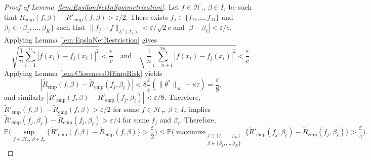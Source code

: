 \documentclass[twoside, onecolumn]{article}
\def\Hcal{\mathcal{H}}
\def\Hcal{\mathcal{H}}
\DeclareMathOperator*{\maximize}{maximize}
\begin{document}
\begin{proof}[Proof of Lemma~\ref{lem:EpsilonNetInSymmetrization}]


Let $f\in \mathcal{H}_\tau$, $\beta\in I_\tau$ be such that $\widetilde R_{\text{emp}}(f,\beta)-\widetilde R'_{\text{emp}}(f,\beta)>\varepsilon/2$. There exists $f_j\in \{f_1, \dots, f_M\}$ and $\beta_\ell\in \{\beta_1, \dots, \beta_K\}$ such that $\|f_j-f\|_{L^2(T_x)}<\varepsilon/\sqrt{2}c$ and $|\beta-\beta_\ell|<\varepsilon/c$. Applying Lemma \ref{lem:EpslnNetRestriction} gives
\[
\sqrt{\frac{1}{n}\sum_{i=1}^{n}|f(x_i)-f_j(x_i)|^{2}}<\frac{\varepsilon}{c}\quad\text{and}\quad
\sqrt{\frac{1}{n}\sum_{i=n+1}^{2n}|f(x_i)-f_j(x_i)|^{2}}<\frac{\varepsilon}{c}.
\]
Applying Lemma \ref{lem:ClosenessOfEmpRisk} yields
\[
|\widetilde{R}_{\text{emp}}(f,\beta)-\widetilde{R}_{\text{emp}}(f_j, \beta_\ell)|<8\frac{\varepsilon}{c}(\|\theta^*\|_{\infty} + \kappa \tau)=
\frac{\varepsilon}{8},
\]
and similarly $|\widetilde{R}'_{\text{emp}}(f,\beta)-\widetilde{R}'_{\text{emp}}(f_j, \beta_\ell)|< \varepsilon/8$.
Therefore, $\widetilde R'_{\text{emp}}(f,\beta)-\widetilde R_{\text{emp}}(f,\beta)>\varepsilon/2$ for some $f\in \Hcal_{\tau}$, $\beta \in I_{\tau}$ implies $
\widetilde{R}'_{\text{emp}}(f_j, \beta_\ell)-\widetilde{R}_{\text{emp}}(f_j, \beta_\ell)>\varepsilon/4
$ for some $f_j$ and $\beta_\ell$. Therefore,
\[
\mathbb{P}\bigg(\sup_{f\in \mathcal{H}_\tau,\, \beta\in I_\tau}\{\widetilde R'_{\text{emp}}(f,\beta)-\widetilde R_{\text{emp}}(f,\beta)\}>\frac{\varepsilon}{2}\bigg)\leq 
\mathbb{P}\bigg( \maximize_{\substack{f\in \{f_1, \dots, f_M\}\\
\beta\in \{\beta_1, \dots, \beta_K\}}}\{\widetilde{R}'_{\text{emp}}(f_j, \beta_\ell)-\widetilde{R}_{\text{emp}}(f_j, \beta_\ell)\}>\frac{\varepsilon}{4}
\bigg).
\]
\end{proof}






\end{document}
